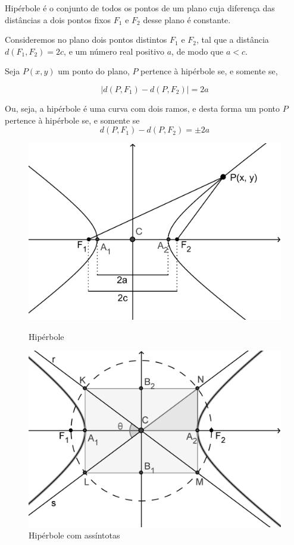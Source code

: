 Hipérbole é o conjunto de todos os pontos de um plano cuja diferença das distâncias a dois pontos fixos $F_1$ e $F_2$ desse plano é constante.

Consideremos no plano dois pontos distintos $F_1$ e $F_2$, tal que a distância $d(F_1, F_2)=2c$, e um número real positivo $a$, de modo que $a<c$.

Seja $P(x, y)$ um ponto do plano, $P$ pertence à hipérbole se, e somente se,

$$|d(P, F_1)-d(P, F_2)|=2a$$

Ou, seja, a hipérbole é uma curva com dois ramos, e desta forma um ponto $P$ pertence à hipérbole se, e somente se
$$d(P, F_1)-d(P, F_2)=\pm 2a$$

\begin{figure}[H]
\begin{minipage}[b]{0.45\linewidth}
\includegraphics[width=\linewidth]{analitica/imagens/hiperboleh.png}
\caption{Hipérbole}
\label{fig:hiperboel}
\end{minipage} \hfill
\begin{minipage}[b]{0.45\linewidth}
\includegraphics[width=\linewidth]{analitica/imagens/hiperboleh2.png}
\caption{Hipérbole com assíntotas}
\label{fig:hiperbole2}
\end{minipage}
\end{figure}

